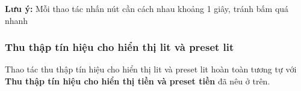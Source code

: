 \textbf{Lưu ý:} Mỗi thao tác nhấn nút cần cách nhau khoảng 1 giây, tránh bấm quá nhanh

\subsubsection{Thu thập tín hiệu cho hiển thị lit và preset lit}

Thao tác thu thập tín hiệu cho hiển thị lit và preset lit hoàn toàn tương tự với \textbf{Thu thập tín hiệu cho hiển thị tiền và preset tiền} đã nêu ở trên.